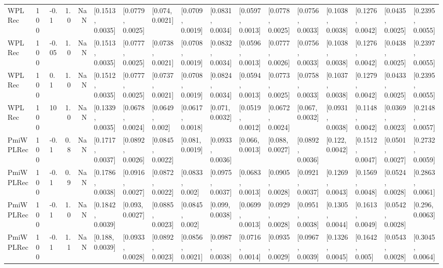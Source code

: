 \begin{tabular}{lllrrllllllllllll}
    WPLRec &  100 &  -0.1 &   1.0 &   NaN &  [0.1513, 0.0035] &  [0.0779, 0.0025] &   [0.074, 0.0021] &  [0.0709, 0.0019] &  [0.0831, 0.0034] &  [0.0597, 0.0013] &  [0.0778, 0.0025] &  [0.0756, 0.0033] &  [0.1038, 0.0038] &  [0.1276, 0.0042] &  [0.0435, 0.0025] &  [0.2395, 0.0055] \\
    WPLRec &  100 & -0.05 &   1.0 &   NaN &  [0.1513, 0.0035] &  [0.0777, 0.0025] &  [0.0738, 0.0021] &  [0.0708, 0.0019] &  [0.0832, 0.0034] &  [0.0596, 0.0013] &  [0.0777, 0.0026] &  [0.0756, 0.0033] &  [0.1038, 0.0038] &  [0.1276, 0.0042] &  [0.0438, 0.0025] &  [0.2397, 0.0055] \\
    WPLRec &  100 &   0.1 &   1.0 &   NaN &  [0.1512, 0.0035] &  [0.0777, 0.0025] &  [0.0737, 0.0021] &  [0.0708, 0.0019] &  [0.0824, 0.0034] &  [0.0594, 0.0013] &  [0.0773, 0.0025] &  [0.0758, 0.0033] &  [0.1037, 0.0038] &  [0.1279, 0.0042] &  [0.0433, 0.0025] &  [0.2395, 0.0055] \\
    WPLRec &  100 &    10 &   1.0 &   NaN &  [0.1339, 0.0035] &  [0.0678, 0.0024] &   [0.0649, 0.002] &  [0.0617, 0.0018] &   [0.071, 0.0032] &  [0.0519, 0.0012] &  [0.0672, 0.0024] &   [0.067, 0.0032] &  [0.0931, 0.0038] &  [0.1148, 0.0042] &  [0.0369, 0.0023] &  [0.2148, 0.0057] \\
 PmiWPLRec &  100 &  -0.1 &   0.8 &   NaN &  [0.1717, 0.0037] &  [0.0892, 0.0026] &  [0.0845, 0.0022] &   [0.081, 0.0019] &  [0.0933, 0.0036] &   [0.066, 0.0013] &   [0.088, 0.0027] &  [0.0892, 0.0036] &   [0.122, 0.0042] &  [0.1512, 0.0047] &  [0.0501, 0.0027] &  [0.2732, 0.0059] \\
 PmiWPLRec &  100 &  -0.1 &   0.9 &   NaN &  [0.1786, 0.0038] &  [0.0916, 0.0027] &  [0.0872, 0.0022] &   [0.0833, 0.002] &  [0.0975, 0.0037] &  [0.0683, 0.0013] &  [0.0905, 0.0028] &  [0.0921, 0.0037] &  [0.1269, 0.0043] &  [0.1569, 0.0048] &  [0.0524, 0.0028] &  [0.2863, 0.0061] \\
 PmiWPLRec &  100 &  -0.1 &   1.0 &   NaN &  [0.1842, 0.0039] &   [0.093, 0.0027] &  [0.0885, 0.0023] &   [0.0845, 0.002] &   [0.099, 0.0038] &  [0.0699, 0.0013] &  [0.0929, 0.0028] &  [0.0951, 0.0038] &  [0.1305, 0.0044] &  [0.1613, 0.0049] &  [0.0542, 0.0028] &   [0.296, 0.0063] \\
 PmiWPLRec &  100 &  -0.1 &   1.1 &   NaN &   [0.188, 0.0039] &  [0.0933, 0.0028] &  [0.0892, 0.0023] &  [0.0856, 0.0021] &  [0.0987, 0.0038] &  [0.0716, 0.0014] &  [0.0935, 0.0029] &  [0.0967, 0.0039] &  [0.1326, 0.0045] &   [0.1642, 0.005] &  [0.0543, 0.0028] &  [0.3045, 0.0064] \\

\end{tabular}
